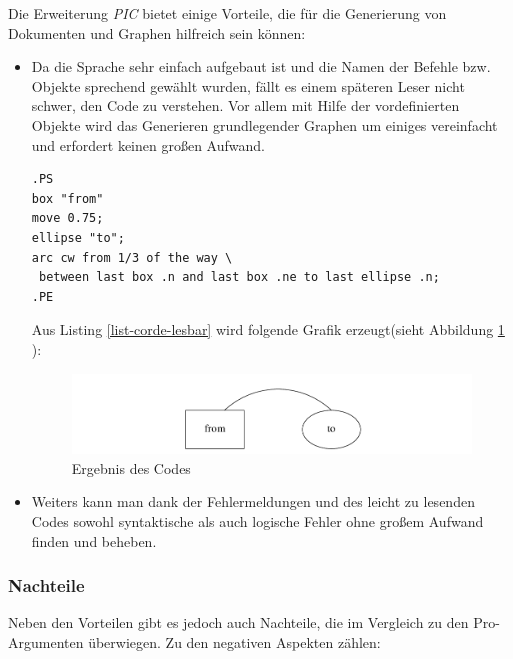 \noindent
Die Erweiterung \textit{PIC} bietet einige Vorteile, die für die Generierung von Dokumenten und Graphen hilfreich sein können:
\\
\begin{itemize}
	\item Da die Sprache sehr einfach aufgebaut ist und die Namen der Befehle bzw. Objekte sprechend gewählt wurden, fällt es einem späteren Leser nicht schwer, den Code zu verstehen. Vor allem mit Hilfe der vordefinierten Objekte wird das Generieren grundlegender Graphen um einiges vereinfacht und erfordert keinen großen Aufwand.
	\lstset{frame=lines}
	\lstset{basicstyle=\footnotesize}
	\begin{lstlisting}
.PS
box "from"
move 0.75;
ellipse "to";
arc cw from 1/3 of the way \
 between last box .n and last box .ne to last ellipse .n;
.PE
	\end{lstlisting}
	
	\noindent
	Aus Listing \ref{list-corde-lesbar} wird folgende Grafik erzeugt(sieht Abbildung \ref{SprechendName} \footnotemark[17]):
	\begin{figure}[H]
		\begin{center}
			\includegraphics[width=13cm]{images/PIC_Aufbau_Einfachkeit.png}
			\caption{Ergebnis des Codes}
			\label{SprechendName}
		\end{center}
	\end{figure}
	
	\item Weiters kann man dank der Fehlermeldungen und des leicht zu lesenden Codes sowohl syntaktische als auch logische Fehler ohne großem Aufwand finden und beheben.


\end{itemize}

\subsubsection{Nachteile}
\pra

\noindent
Neben den Vorteilen gibt es jedoch auch Nachteile, die im Vergleich zu den Pro-Argumenten überwiegen. Zu den negativen Aspekten zählen:

